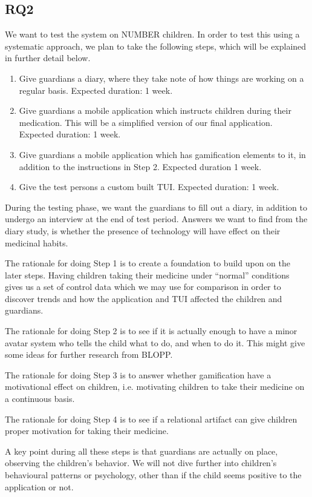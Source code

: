 \subsection{RQ2}
\label{sec:RQ2-methodology}
We want to test the system on NUMBER children. In order to test this using a systematic approach, we plan to take the following steps, which will be explained in further detail below. 
\begin{enumerate}
  \item Give guardians a diary, where they take note of how things are working on a regular basis. Expected duration: 1 week.
  \item Give guardians a mobile application which instructs children during their medication. This will be a simplified version of our final application. Expected duration: 1 week. 
  \item Give guardians a mobile application which has gamification elements to it, in addition to the instructions in Step 2. Expected duration 1 week.   
  \item Give the test persons a custom built TUI. Expected duration: 1 week. 
\end{enumerate}
During the testing phase, we want the guardians to fill out a diary, in addition to undergo an interview at the end of test period. Answers we want to find from the diary study, is whether the presence of technology will have effect on their medicinal habits. 

The rationale for doing Step 1 is to create a foundation to build upon on the later steps. Having children taking their medicine under ``normal'' conditions gives us a set of control data which we may use for comparison in order to discover trends and how the application and TUI affected the children and guardians. 

The rationale for doing Step 2 is to see if it is actually enough to have a minor avatar system who tells the child what to do, and when to do it. This might give some ideas for further research from BLOPP. 


The rationale for doing Step 3 is to answer whether gamification have a motivational effect on children, i.e. motivating children to take their medicine on a continuous basis. 

The rationale for doing Step 4 is to see if a relational artifact can give children proper motivation for taking their medicine.

A key point during all these steps is that guardians are actually on place, observing the children's behavior. We will not dive further into children's behavioural patterns or psychology, other than if the child seems positive to the application or not.    
 
